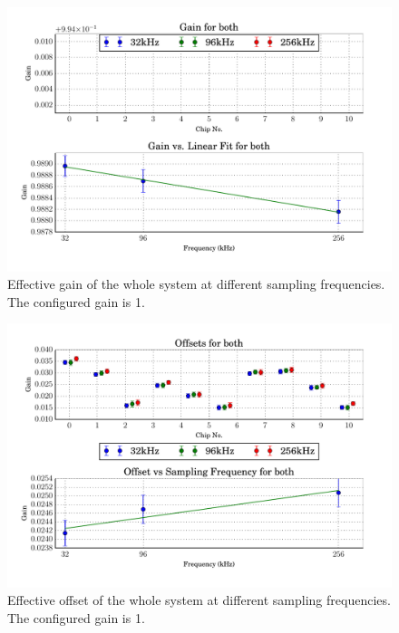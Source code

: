 \begin{figure}
    \centering
    \includegraphics[width=\linewidth]{images/plots/dc_slope_for_both.pdf}
    \caption{Effective gain of the whole system at different sampling frequencies. The configured gain is 1.}
    \label{fig:both_gain}
\end{figure}
\begin{figure}
    \centering
    \includegraphics[width=\linewidth]{images/plots/dc_offsets_both.pdf}
    \caption{Effective offset of the whole system at different sampling frequencies. The configured gain is 1.}
    \label{fig:both_offset}
\end{figure}
